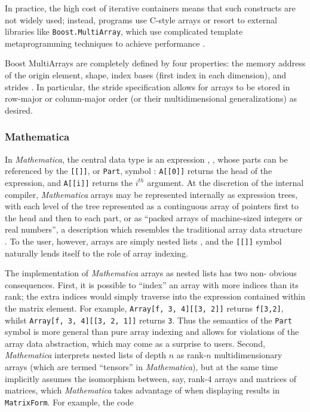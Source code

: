 \documentclass[preprint]{sigplanconf}
\newcommand{\Mathematica}{\textit{Mathematica}}
\newcommand{\code}[1]{\texttt{#1}}
\begin{document}
In practice, the high cost of iterative containers means that such constructs
are not widely used; instead, programs use C-style arrays or resort to
external libraries like \code{Boost.MultiArray}, which use complicated
template metaprogramming techniques to achieve performance
\cite{Garcia:2005ma}.

Boost MultiArrays are completely defined by four properties: the memory
address of the origin element, shape, index bases (first index in each
dimension), and strides \cite{Garcia:2005ma}. In particular, the stride
specification allows for arrays to be stored in row-major or column-major
order (or their multidimensional generalizations) as desired.


\subsubsection{Mathematica}

In \Mathematica, the central data type is an expression
\cite{mathematica:expr}, \url{}, whose parts can be referenced by the
\code{[[]]}, or \code{Part}, symbol \cite{mathematica:part}: \code{A[[0]]}
returns the head of the expression, and \code{A[[i]]} returns the $i^{th}$
argument. At the discretion of the internal compiler, \Mathematica{} arrays
may be represented internally as expression trees, with each level of the tree
represented as a continguous array of pointers first to the head and then to
each part, or as ``packed arrays of machine-sized integers or real numbers'',
a description which resembles the traditional array data structure
\cite{mathematica:int}. To the user, however, arrays are simply nested lists
\cite{mathematica:nl}, and the \code{[[]]} symbol naturally lends itself to
the role of array indexing.

The implementation of \Mathematica{} arrays as nested lists has two non-
obvious consequences. First, it is possible to ``index'' an array with more
indices than its rank; the extra indices would simply traverse into the
expression contained within the matrix element. For example, \code{Array[f,
{3, 4}][[3, 2]]} returns \code{f[3,2]}, whilst \code{Array[f, {3, 4}][[3, 2,
1]]} returns \code{3}. Thus the semantics of the \code{Part} symbol is more
general than pure array indexing and allows for violations of the array data
abstraction, which may come as a surprise to users. Second, \Mathematica{}
interprets nested lists of depth $n$ as rank-$n$ multidimensionary arrays
(which are termed ``tensors'' in \Mathematica), but at the same time
implicitly assumes the isomorphism between, say, rank-4 arrays and matrices of
matrices, which \Mathematica{} takes advantage of when displaying results in
\code{MatrixForm}. For example, the code
\end{document}
